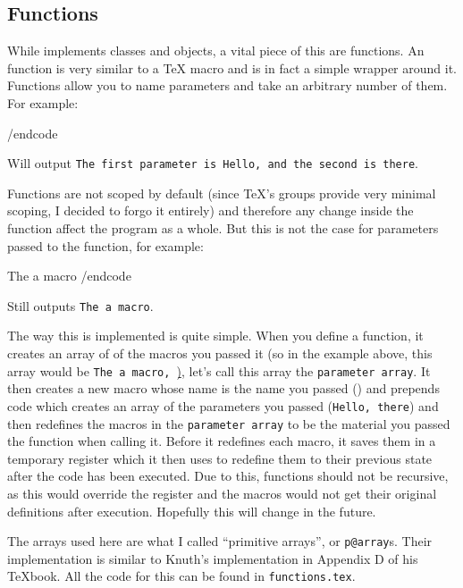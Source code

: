 \subsection{Functions}

While \OoP{} implements classes and objects, a vital piece of this are functions.
An \OoP{} function is very similar to a \TeX{} macro and is in fact a simple wrapper around it.
Functions allow you to name parameters and take an arbitrary number of them.
For example:

\begincode
\function{}

/endcode

Will output {\tt The first parameter is Hello, and the second is there}.

Functions are not scoped by default (since \TeX's groups provide very minimal scoping, I decided to forgo
it entirely) and therefore any change inside the function affect the program as a whole.
But this is not the case for parameters passed to the function, for example:

\begincode
\def\a{The a macro}

\a
/endcode

Still outputs {\tt The a macro}.

\beginscare
The way this is implemented is quite simple.
When you define a function, it creates an array of of the macros you passed it (so in the example above, this array
would be {\tt\lbrace\string\a, \string\b\rbrace}), let's call this array the {\tt parameter array}.
It then creates a new macro whose name is the name you passed ({\tt\string\foo}) and prepends code which creates an
array of the parameters you passed ({\tt\lbrace Hello, there\rbrace}) and then redefines the macros in the {\tt parameter array}
to be the material you passed the function when calling it.
Before it redefines each macro, it saves them in a temporary register which it then uses to redefine them to their previous
state after the code has been executed.
Due to this, functions should not be recursive, as this would override the register and the macros would not get their original
definitions after execution.
Hopefully this will change in the future.

The arrays used here are what I called ``primitive arrays'', or {\tt p@array}s.
Their implementation is similar to Knuth's implementation in Appendix D of his \TeX book.
All the code for this can be found in {\tt functions.tex}.
\endscare


